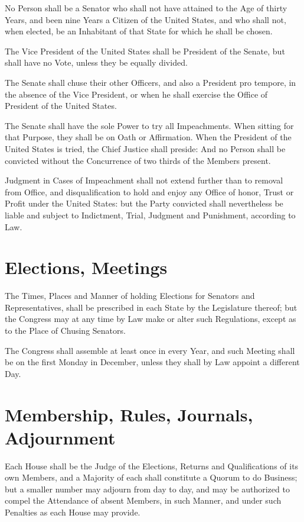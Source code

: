 \documentclass{constitution}
\begin{document}
No Person shall be a Senator who shall not have attained to the Age of thirty Years,
and been nine Years a Citizen of the United States,
and who shall not, when elected, be an Inhabitant of that State for which he shall be chosen.

The Vice President of the United States shall be President of the Senate,
but shall have no Vote, unless they be equally divided.

The Senate shall chuse their other Officers,
and also a President pro tempore, in the absence of the Vice President,
or when he shall exercise the Office of President of the United States.

The Senate shall have the sole Power to try all Impeachments.
When sitting for that Purpose, they shall be on Oath or Affirmation.
When the President of the United States is tried, the Chief Justice shall preside:
And no Person shall be convicted without the Concurrence
of two thirds of the Members present.

Judgment in Cases of Impeachment shall not extend further than to removal from Office,
and disqualification to hold and enjoy any Office
of honor, Trust or Profit under the United States:
but the Party convicted shall nevertheless be liable and subject to
Indictment, Trial, Judgment and Punishment, according to Law.

\section{Elections, Meetings}
The Times, Places and Manner of holding Elections for Senators and Representatives,
shall be prescribed in each State by the Legislature thereof;
but the Congress may at any time by Law make or alter such Regulations,
except as to the Place of Chusing Senators.

The Congress shall assemble at least once in every Year,
and such Meeting shall be on the first Monday in December,
unless they shall by Law appoint a different Day.

\section{Membership, Rules, Journals, Adjournment}
Each House shall be the Judge of the Elections, Returns and Qualifications of its own Members,
and a Majority of each shall constitute a Quorum to do Business;
but a smaller number may adjourn from day to day,
and may be authorized to compel the Attendance of absent Members,
in such Manner, and under such Penalties as each House may provide.
\end{document}
